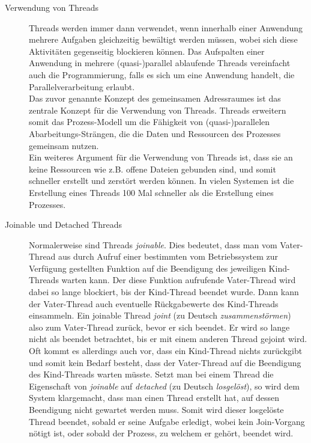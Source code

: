\begin{description}
					\item[Verwendung von Threads]
						
						Threads werden immer dann verwendet, wenn innerhalb einer Anwendung mehrere Aufgaben gleichzeitig bewältigt werden müssen, wobei sich diese Aktivitäten gegenseitig blockieren können. Das Aufspalten einer Anwendung in mehrere (quasi-)parallel ablaufende Threads vereinfacht auch die Programmierung, falls es sich um eine Anwendung handelt, die Parallelverarbeitung erlaubt.\\
						Das zuvor genannte Konzept des gemeinsamen Adressraumes ist das zentrale Konzept für die Verwendung von Threads. Threads erweitern somit das Prozess-Modell um die Fähigkeit von (quasi-)parallelen Abarbeitungs-Strängen, die die Daten und Ressourcen des Prozesses gemeinsam nutzen.\\
						Ein weiteres Argument für die Verwendung von Threads ist, dass sie an keine Ressourcen wie z.B. offene Dateien gebunden sind, und somit schneller erstellt und zerstört werden können. In vielen Systemen ist die Erstellung eines Threads 100 Mal schneller als die Erstellung eines Prozesses. \cite{ModerneBetriebssysteme}
						
					\item[Joinable und Detached Threads]
					
						Normalerweise sind Threads \textit{joinable}. Dies bedeutet, dass man vom Vater-Thread aus durch Aufruf einer bestimmten vom Betriebssystem zur Verfügung gestellten Funktion auf die Beendigung des jeweiligen Kind-Threads warten kann. Der diese Funktion aufrufende Vater-Thread wird dabei so lange blockiert, bis der Kind-Thread beendet wurde. Dann kann der Vater-Thread auch eventuelle Rückgabewerte des Kind-Threads einsammeln. Ein joinable Thread \textit{joint} (zu Deutsch \textit{zusammenstörmen}) also zum Vater-Thread zurück, bevor er sich beendet.
						Er wird so lange nicht als beendet betrachtet, bis er mit einem anderen Thread gejoint wird.\\
						Oft kommt es allerdings auch vor, dass ein Kind-Thread nichts zurückgibt und somit kein Bedarf besteht, dass der Vater-Thread auf die Beendigung des Kind-Threads warten müsste. Setzt man bei einem Thread die Eigenschaft von \textit{joinable} auf \textit{detached} (zu Deutsch \textit{losgelöst}), so wird dem System klargemacht, dass man einen Thread erstellt hat, auf dessen Beendigung nicht gewartet werden muss. Somit wird dieser losgelöste Thread beendet, sobald er seine Aufgabe erledigt, wobei kein Join-Vorgang nötigt ist, oder sobald der Prozess, zu welchem er gehört, beendet wird. \cite{ParaProgRauber} \cite{ThreadsRheinwerk}
						

\end{description}
